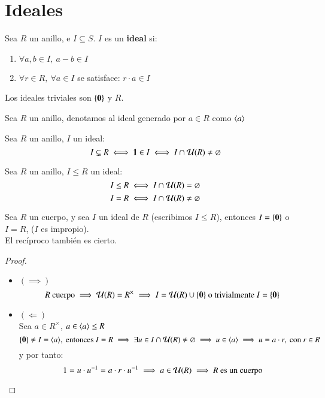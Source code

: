 \section{Ideales}

\begin{dfn}[Ideal]
    Sea $R$ un anillo, e $I \subseteq S$. $I$ es un \textbf{ideal} si:
    \begin{enumerate}
        \item $\forall a, b \in I,\ a - b \in I$
        \item $\forall r \in R,\ \forall a \in I$ se satisface: $r\cdot a \in I$
    \end{enumerate}
    Los ideales triviales son $\{\mathbf{0}\}$ y $R$.
\end{dfn}

\begin{obs}
    Sea $R$ un anillo, denotamos al ideal generado por $a \in R$ como
    $
        \langle a\rangle
    $
\end{obs}

\begin{pro}
    Sea $R$ un anillo, $I$ un ideal:
    $$
        I \subsetneq R \iff \mathbf{1} \in I \iff I \cap \mathcal{U}(R) \neq \varnothing
    $$
\end{pro}

\begin{obs}
    Sea $R$ un anillo, $I \leq R$ un ideal:
    $$
        I \leq R \iff I \cap \mathcal{U}(R) = \varnothing
    $$
    $$
        I = R \iff I \cap \mathcal{U}(R) \neq \varnothing
    $$
\end{obs}


\begin{pro}
    Sea $R$ un cuerpo, y sea $I$ un ideal de $R$ (escribimos $I \leq R$), entonces $I = \{\mathbf{0}\}$ o $I = R$, ($I$ es impropio).\\
    El recíproco también es cierto.
\end{pro}

\begin{proof}$ $
    \begin{itemize}
        \item $\left( \implies \right)$
        $$
            R \text{ cuerpo} \implies \mathcal{U}(R) = R^{\times} \implies I = \mathcal{U}(R) \cup \{\mathbf{0}\} \text{ o trivialmente } I = \{\mathbf{0}\}
        $$
        \item $\left( \Longleftarrow \right)$\\
        Sea $a \in R^{\times}$, $a \in \langle a\rangle \leq R$
        $$
            \{\mathbf{0}\} \neq I = \langle a\rangle,\text{ entonces } I = R \implies \exists u \in I \cap \mathcal{U}(R) \neq \varnothing \implies u \in \langle a\rangle \implies u = a\cdot r, \text{ con } r \in R
        $$
        y por tanto:
        $$
            1 = u \cdot u^{-1} = a \cdot r \cdot u^{-1} \implies a \in \mathcal{U}(R) \implies R \text{ es un cuerpo}
        $$
    \end{itemize}
\end{proof}

